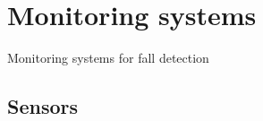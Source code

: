 \section{Monitoring systems}

\begingroup
{}  %
\begin{frame}[noframenumbering]{}
    \centering
    \vspace{3cm}
    \Huge
    \textcolor{myblue}{Monitoring systems for fall detection}
\end{frame}
\endgroup


\subsection{Sensors}

